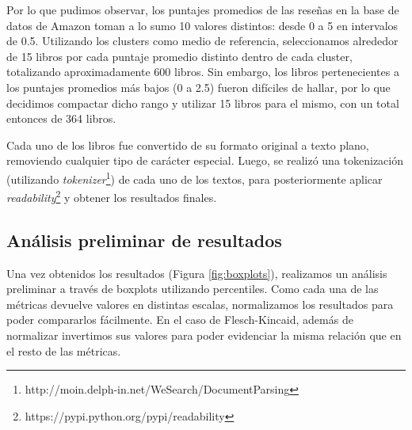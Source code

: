 \documentclass[12pt,journal,compsoc]{IEEEtran}
\begin{document}
Por lo que pudimos observar, los puntajes promedios de las reseñas en la base de datos de Amazon toman a lo sumo 10 valores distintos: desde 0 a 5 en intervalos de 0.5. Utilizando los clusters como medio de referencia, seleccionamos alrededor de 15 libros por cada puntaje promedio distinto dentro de cada cluster, totalizando aproximadamente 600 libros. Sin embargo, los libros pertenecientes a los puntajes promedios más bajos (0 a 2.5) fueron difíciles de hallar, por lo que decidimos compactar dicho rango y utilizar 15 libros para el mismo, con un total entonces de 364 libros.

Cada uno de los libros fue convertido de su formato original a texto plano, removiendo cualquier tipo de carácter especial. Luego, se realizó una tokenización (utilizando \textit{tokenizer}\footnote{http://moin.delph-in.net/WeSearch/DocumentParsing}) de cada uno de los textos, para posteriormente aplicar \textit{readability}\footnote{https://pypi.python.org/pypi/readability} y obtener los resultados finales.

\subsection{Análisis preliminar de resultados}

Una vez obtenidos los resultados (Figura \ref{fig:boxplots}), realizamos un análisis preliminar a través de boxplots utilizando percentiles. Como cada una de las métricas devuelve valores en distintas escalas, normalizamos los resultados para poder compararlos fácilmente. En el caso de Flesch-Kincaid, además de normalizar invertimos sus valores para poder evidenciar la misma relación que en el resto de las métricas.
\end{document}
